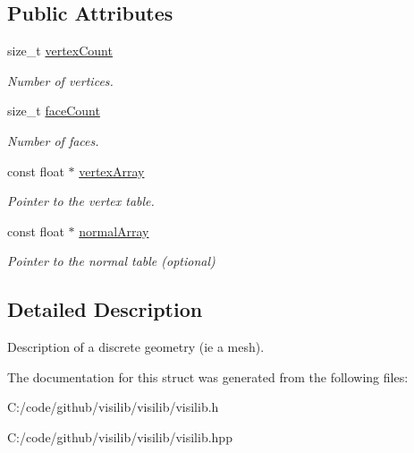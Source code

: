 \subsection*{Public Attributes}
\begin{DoxyCompactItemize}
\item 
\mbox{\label{structvisilib_1_1_discrete_geometry_description_af027f5588becd10f57feacdd969c36e8}} 
size\+\_\+t \mbox{\hyperlink{structvisilib_1_1_discrete_geometry_description_af027f5588becd10f57feacdd969c36e8}{vertex\+Count}}
\begin{DoxyCompactList}\small\item\em Number of vertices. \end{DoxyCompactList}\item 
\mbox{\label{structvisilib_1_1_discrete_geometry_description_ad3e0036614577235871af289b06e9153}} 
size\+\_\+t \mbox{\hyperlink{structvisilib_1_1_discrete_geometry_description_ad3e0036614577235871af289b06e9153}{face\+Count}}
\begin{DoxyCompactList}\small\item\em Number of faces. \end{DoxyCompactList}\item 
\mbox{\label{structvisilib_1_1_discrete_geometry_description_ae4c6fc2ef794048d08127ffec2963ff9}} 
const float $\ast$ \mbox{\hyperlink{structvisilib_1_1_discrete_geometry_description_ae4c6fc2ef794048d08127ffec2963ff9}{vertex\+Array}}
\begin{DoxyCompactList}\small\item\em Pointer to the vertex table. \end{DoxyCompactList}\item 
\mbox{\label{structvisilib_1_1_discrete_geometry_description_acfd5e09da7d73d29b54380455db56e37}} 
const float $\ast$ \mbox{\hyperlink{structvisilib_1_1_discrete_geometry_description_acfd5e09da7d73d29b54380455db56e37}{normal\+Array}}
\begin{DoxyCompactList}\small\item\em Pointer to the normal table (optional) \end{DoxyCompactList}\end{DoxyCompactItemize}


\subsection{Detailed Description}
Description of a discrete geometry (ie a mesh). 

The documentation for this struct was generated from the following files\+:\begin{DoxyCompactItemize}
\item 
C\+:/code/github/visilib/visilib/visilib.\+h\item 
C\+:/code/github/visilib/visilib/visilib.\+hpp\end{DoxyCompactItemize}

